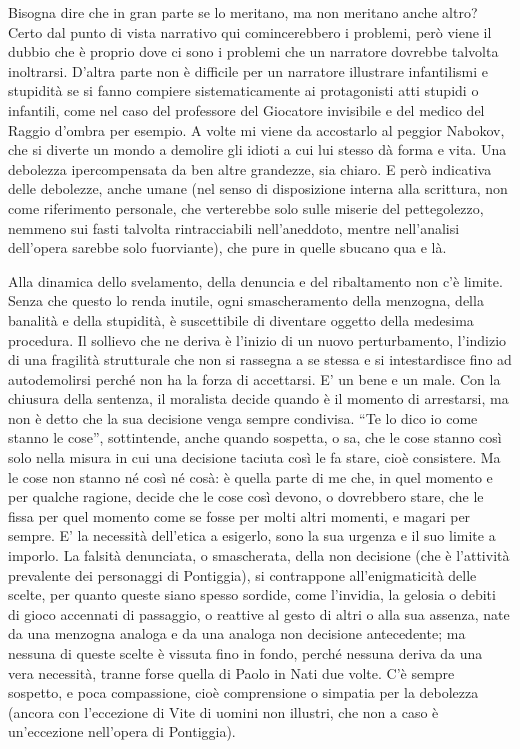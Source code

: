 Bisogna dire che in gran parte se lo meritano, ma non meritano anche altro? Certo dal punto di vista narrativo qui comincerebbero i problemi, però viene il dubbio che è proprio dove ci sono i problemi che un narratore dovrebbe talvolta inoltrarsi. D’altra parte non è difficile per un narratore illustrare infantilismi e stupidità se si fanno compiere sistematicamente ai protagonisti atti stupidi o infantili, come nel caso del professore del Giocatore invisibile e del medico del Raggio d’ombra per esempio.
A volte mi viene da accostarlo al peggior Nabokov, che si diverte un mondo a demolire gli idioti a cui lui stesso dà forma e vita. Una debolezza ipercompensata da ben altre grandezze, sia chiaro. E però indicativa delle debolezze, anche umane (nel senso di disposizione interna alla scrittura, non come riferimento personale, che verterebbe solo sulle miserie del pettegolezzo, nemmeno sui fasti talvolta rintracciabili nell’aneddoto, mentre nell’analisi dell’opera sarebbe solo fuorviante), che pure in quelle sbucano qua e là.

Alla dinamica dello svelamento, della denuncia e del ribaltamento non c’è limite. Senza che questo lo renda inutile, ogni smascheramento della menzogna, della banalità e della stupidità, è suscettibile di diventare oggetto della medesima procedura. Il sollievo che ne deriva è l’inizio di un nuovo perturbamento, l’indizio di una fragilità strutturale che non si rassegna a se stessa e si intestardisce fino ad autodemolirsi perché non ha la forza di accettarsi. E’ un bene e un male. Con la chiusura della sentenza, il moralista decide quando è il momento di arrestarsi, ma non è detto che la sua decisione venga sempre condivisa. “Te lo dico io come stanno le cose”, sottintende, anche quando sospetta, o sa, che le cose stanno così solo nella misura in cui una decisione taciuta così le fa stare, cioè consistere. Ma le cose non stanno né così né cosà: è quella parte di me che, in quel momento e per qualche ragione, decide che le cose così devono, o dovrebbero stare, che le fissa per quel momento come se fosse per molti altri momenti, e magari per sempre. E’ la necessità dell’etica a esigerlo, sono la sua urgenza e il suo limite a imporlo. La falsità denunciata, o smascherata, della non decisione (che è l’attività prevalente dei personaggi di Pontiggia), si contrappone all’enigmaticità delle scelte, per quanto queste siano spesso sordide, come l’invidia, la gelosia o debiti di gioco accennati di passaggio, o reattive al gesto di altri o alla sua assenza, nate da una menzogna analoga e da una analoga non decisione antecedente; ma nessuna di queste scelte è vissuta fino in fondo, perché nessuna deriva da una vera necessità, tranne forse quella di Paolo in Nati due volte. C’è sempre sospetto, e poca compassione, cioè comprensione o simpatia per la debolezza (ancora con l’eccezione di Vite di uomini non illustri, che non a caso è un’eccezione nell’opera di Pontiggia).

